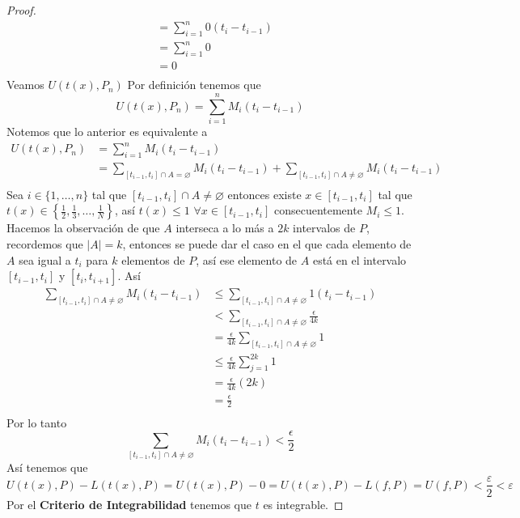 \documentclass[a4paper]{article}
\begin{document}
\begin{proof}
\begin{align*}
                              &= \sum_{i = 1}^{n} 0(t_{i} - t_{i - 1}) \\
                              &= \sum_{i = 1}^{n} 0 \\
                              &= 0 \\
    \end{align*}
    Veamos \(U\left(t(x), P_{n}\right)\)
    \newline 
    Por definición tenemos que
    \[
        U\left(t(x), P_{n}\right) = \sum_{i = 1}^{n} M_{i}\left(t_{i} - t_{i - 1}\right)
    \]
    Notemos que lo anterior es equivalente a
    \begin{align*}
        U\left(t(x), P_{n}\right) &= \sum_{i = 1}^{n} M_{i}\left(t_{i} - t_{i - 1}\right) \\
        &= \sum_{[t_{i - 1}, t_{i}] \cap A = \varnothing} M_{i}\left(t_{i} - t_{i - 1}\right)
          + \sum_{[t_{i - 1}, t_{i}] \cap A \neq \varnothing} M_{i}\left(t_{i} - t_{i - 1}\right) \\
    \end{align*}
    Sea \(i \in \{1, \dotsc, n\}\) tal que \([t_{i - 1}, t_{i}] \cap A \neq \varnothing\)
    entonces existe \(x \in [t_{i - 1}, t_{i}]\) tal que \(t\left(x\right) \in \left\{\frac{1}{2}, 
    \frac{1}{3}, \dotsc, \frac{1}{N}\right\}\), así \(t(x) \leq 1\) \(\forall x \in [t_{i - 1}, t_{i}]\)
    consecuentemente \(M_{i} \leq 1\). Hacemos la observación de que \(A\) interseca a lo más a \(2k\)
    intervalos de \(P\), recordemos que \(|A| = k\), entonces se puede dar el caso en el que cada 
    elemento de \(A\) sea igual a \(t_{i}\) para \(k\) elementos de \(P\), así 
    ese elemento de \(A\) está en el intervalo \([t_{i - 1}, t_{i}]\) y \([t_{i}, t_{i + 1}]\).
    Así 
    \begin{align*}
        \sum_{[t_{i - 1}, t_{i}] \cap A \neq \varnothing} M_{i}\left(t_{i} - t_{i - 1}\right) &\leq  
        \sum_{[t_{i - 1}, t_{i}] \cap A \neq \varnothing} 1\left(t_{i} - t_{i - 1}\right) \\
        &< \sum_{[t_{i - 1}, t_{i}] \cap A \neq \varnothing} \frac{\epsilon}{4k} \\
        &= \frac{\epsilon}{4k} \sum_{[t_{i - 1}, t_{i}] \cap A \neq \varnothing} 1 \\
        &\leq \frac{\epsilon}{4k} \sum_{j = 1}^{2k} 1 \\
        &= \frac{\epsilon}{4k}(2k) \\
        &= \frac{\epsilon}{2} \\
    \end{align*}
    Por lo tanto
    \[
        \sum_{[t_{i - 1}, t_{i}] \cap A \neq \varnothing} M_{i}\left(t_{i} - t_{i - 1}\right) < \frac{\epsilon}{2}
    \]
    Así tenemos que
    \[
        U\left(t(x), P\right) - L\left(t(x), P\right) = U\left(t(x), P\right) - 0 = U\left(t(x), P\right) - L\left(f, P\right) = U\left(f, P\right) < \frac{\varepsilon}{2} < \varepsilon 
    \]
    Por el \textbf{Criterio de Integrabilidad} tenemos que \(t\) es integrable.
\end{proof}
\end{document}
